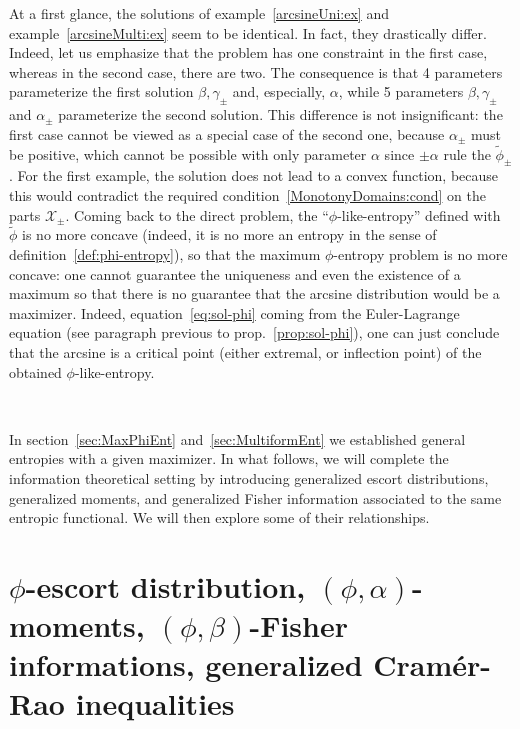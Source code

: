 \documentclass[entropy,article,submit,moreauthors,pdftex]{Definitions/mdpi}
\def\X{\mathcal{X}}%
\begin{document}
{At   a  first   glance,   the  solutions   of  example~\ref{arcsineUni:ex}   and
example~\ref{arcsineMulti:ex} seem  to be identical.  In  fact, they drastically
differ.  Indeed,  let us emphasize  that the problem  has one constraint  in the
first case, whereas in the second case,  there are two.  The consequence is that
4  parameters   parameterize  the   first  solution  $\beta,   \gamma_\pm$  and,
especially, $\alpha$,  while 5  parameters $\beta, \gamma_\pm$  and $\alpha_\pm$
parameterize the  second solution.   This difference  is not  insignificant: the
first  case cannot  be viewed  as  a special  case  of the  second one,  because
$\alpha_\pm$  must be  positive, which  cannot be  possible with  only parameter
$\alpha$  since $\pm  \alpha$  rule the  $\widetilde{\phi}_\pm$.  For the  first
example, the  solution does not  lead to a  convex function, because  this would
contradict  the  required   condition~\ref{MonotonyDomains:cond}  on  the  parts
$\X_\pm$. Coming back to the direct problem, the ``$\phi$-like-entropy'' defined
with $\widetilde{\phi}$ is no more concave (indeed,  it is no more an entropy in
the   sense   of   definition~\ref{def:phi-entropy}),  so   that   the   maximum
$\phi$-entropy problem is  no more concave: one cannot  guarantee the uniqueness
and even  the existence  of a  maximum so that  there is  no guarantee  that the
arcsine distribution would be  a maximizer.  Indeed, equation~\eqref{eq:sol-phi}
coming   from   the  Euler-Lagrange   equation   (see   paragraph  previous   to
prop.~\ref{prop:sol-phi}), one can just conclude  that the arcsine is a critical
point    (either   extremal,    or   inflection    point)   of    the   obtained
$\phi$-like-entropy.}

\

In section~\ref{sec:MaxPhiEnt} and~\ref{sec:MultiformEnt} we established general
entropies  with a  given  maximizer.   In what  follows,  we  will complete  the
information theoretical setting by introducing generalized escort distributions,
generalized moments, and  generalized Fisher information associated  to the same
entropic functional. We will then explore some of their relationships.




\section{$\phi$-escort           distribution,          $(\phi,\alpha)$-moments,
  $(\phi,\beta)$-Fisher informations,  generalized Cram\'er-Rao inequalities}
\label{sec:EscortCR}
\end{document}
